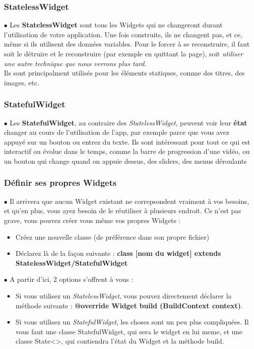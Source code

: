 \subsubsection{StatelessWidget}
\par $\bullet$ Les \textbf{StatelessWidget} sont tous les Widgets qui ne changeront durant l'utilisation de votre application. Une fois construits, ils ne changent pas, et ce, même si ils utilisent des données variables. Pour le forcer à se reconstruire, il faut soit le détruire et le reconstruire (par exemple en quittant la page), soit \textit{utiliser une autre technique que nous verrons plus tard}. \\
Ils sont principalment utilisés pour les éléments statiques, comme des titres, des images, etc.

\subsubsection{StatefulWidget}
\par $\bullet$ Les \textbf{StatefulWidget}, au contraire des \textit{StatelessWidget}, peuvent voir leur \textbf{état} changer au cours de l'utilisation de l'app, par exemple parce que vous avez appuyé sur un bouton ou entrez du texte. Ils sont intéressant pour tout ce qui est interactif ou évolue dans le temps, comme la barre de progression d'une vidéo, ou un bouton qui change quand on appuie dessus, des sliders, des menus déroulants

\subsubsection{Définir ses propres Widgets}
\par $\bullet$ Il arrivera que aucun Widget existant ne correpsondent vraiment à vos besoins, et qu'en plus, vous ayez besoin de le réutiliser à plusieurs endroit. Ce n'est pas grave, vous pouvez créer vous même vos propres Widgets :
\begin{itemize}
  \item Créez une nouvelle classe (de préférence dans son propre fichier)
  \item Déclarez là de la façon suivante : \textbf{class [nom du widget] extends StatelessWidget/StatefulWidget}
\end{itemize}

\par $\bullet$ A partir d'ici, 2 options s'offrent à vous :
\begin{itemize}
  \item Si vous utilisez un \textit{StatelessWidget}, vous pouvez directement déclarer la méthode suivante : \textbf{@override Widget build (BuildContext context)}.

  \item Si vous utilisez un \textit{StatefulWidget}, les choses sont un peu plus compliquées. Il vous faut une classe StatefulWidget, qui sera le widget en lui meme, et une classe State<>, qui contiendra l'état du Widget et la méthode build.
\end{itemize}


